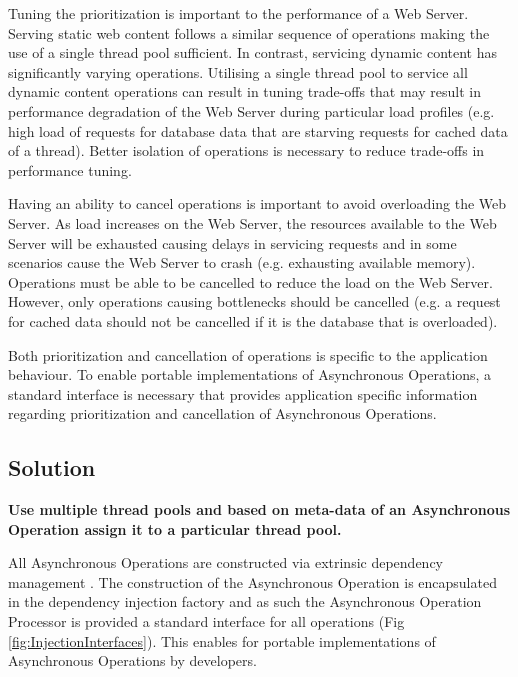 \documentclass[prodmode]{style/acmlarge}
\begin{document}
Tuning the prioritization is important to the performance of a Web Server.
Serving static web content follows a similar sequence of operations making the
use of a single thread pool sufficient.  In contrast, servicing dynamic content
has significantly varying operations.  Utilising a single thread pool to service
all dynamic content operations can result in tuning trade-offs that may result
in performance degradation of the Web Server during particular load profiles
(e.g. high load of requests for database data that are starving requests for
cached data of a thread).  Better isolation of operations is necessary to reduce
trade-offs in performance tuning.

Having an ability to cancel operations is important to avoid overloading the Web
Server.  As load increases on the Web Server, the resources available to the Web
Server will be exhausted causing delays in servicing requests and in some
scenarios cause the Web Server to crash (e.g. exhausting available memory). 
Operations must be able to be cancelled to reduce the load on the Web Server. 
However, only operations causing bottlenecks should be cancelled (e.g. a request
for cached data should not be cancelled if it is the database that is
overloaded).

Both prioritization and cancellation of operations is specific to the
application behaviour.  To enable portable implementations of Asynchronous
Operations, a standard interface is necessary that provides application specific
information regarding prioritization and cancellation of Asynchronous
Operations.


\subsection{Solution}

\textbf{Use multiple thread pools and based on meta-data of an Asynchronous Operation assign it to a particular thread pool.}

All Asynchronous Operations are constructed via extrinsic dependency management
\cite{ioc}.  The construction of the Asynchronous Operation is encapsulated in
the dependency injection factory and as such the Asynchronous Operation
Processor is provided a standard interface for all operations (Fig
\ref{fig:InjectionInterfaces}).  This enables for portable implementations of
Asynchronous Operations by developers.
\end{document}
